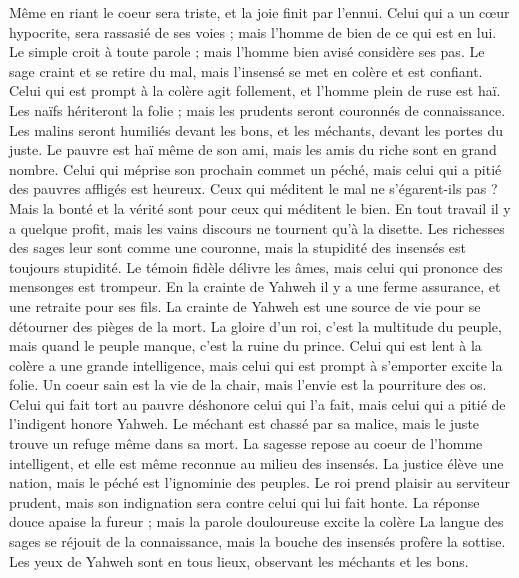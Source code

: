 \begin{multicols}{2}
Même en riant le coeur sera triste, et la joie finit par l'ennui.
Celui qui a un cœur hypocrite, sera rassasié de ses voies ; mais l'homme de bien de ce qui est en lui.
Le simple croit à toute parole ; mais l'homme bien avisé considère ses pas.
Le sage craint et se retire du mal, mais l'insensé se met en colère et est confiant.
Celui qui est prompt à la colère agit follement, et l'homme plein de ruse est haï.
Les naïfs hériteront la folie ; mais les prudents seront couronnés de connaissance.
Les malins seront humiliés devant les bons, et les méchants, devant les portes du juste.
Le pauvre est haï même de son ami, mais les amis du riche sont en grand nombre.
Celui qui méprise son prochain commet un péché, mais celui qui a pitié des pauvres affligés est heureux.
Ceux qui méditent le mal ne s'égarent-ils pas ? Mais la bonté et la vérité sont pour ceux qui méditent le bien.
En tout travail il y a quelque profit, mais les vains discours ne tournent qu'à la disette.
Les richesses des sages leur sont comme une couronne, mais la stupidité des insensés est toujours stupidité.
Le témoin fidèle délivre les âmes, mais celui qui prononce des mensonges est trompeur.
En la crainte de Yahweh il y a une ferme assurance, et une retraite pour ses fils.
La crainte de Yahweh est une source de vie pour se détourner des pièges de la mort.
La gloire d'un roi, c'est la multitude du peuple, mais quand le peuple manque, c'est la ruine du prince.
Celui qui est lent à la colère a une grande intelligence, mais celui qui est prompt à s'emporter excite la folie.
Un coeur sain est la vie de la chair, mais l'envie est la pourriture des os.
Celui qui fait tort au pauvre déshonore celui qui l'a fait, mais celui qui a pitié de l'indigent honore Yahweh.
Le méchant est chassé par sa malice, mais le juste trouve un refuge même dans sa mort.
La sagesse repose au coeur de l'homme intelligent, et elle est même reconnue au milieu des insensés.
La justice élève une nation, mais le péché est l'ignominie des peuples.
Le roi prend plaisir au serviteur prudent, mais son indignation sera contre celui qui lui fait honte.
\VerseOne{}La réponse douce apaise la fureur ; mais la parole douloureuse excite la colère
La langue des sages se réjouit de la connaissance, mais la bouche des insensés profère la sottise.
Les yeux de Yahweh sont en tous lieux, observant les méchants et les bons.

\end{multicols}
